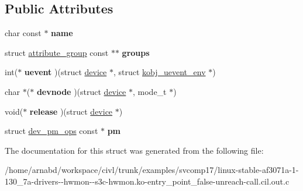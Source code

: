 \subsection*{Public Attributes}
\begin{DoxyCompactItemize}
\item 
\hypertarget{structdevice__type_a801bb4451edcbcd4a28e50d8c2c52688}{}char const $\ast$ {\bfseries name}\label{structdevice__type_a801bb4451edcbcd4a28e50d8c2c52688}

\item 
\hypertarget{structdevice__type_a1027f45aad44b138fd7ed95168e75346}{}struct \hyperlink{structattribute__group}{attribute\+\_\+group} const $\ast$$\ast$ {\bfseries groups}\label{structdevice__type_a1027f45aad44b138fd7ed95168e75346}

\item 
\hypertarget{structdevice__type_a20652da5cfe96ad8a72970169b4370e5}{}int($\ast$ {\bfseries uevent} )(struct \hyperlink{structdevice}{device} $\ast$, struct \hyperlink{structkobj__uevent__env}{kobj\+\_\+uevent\+\_\+env} $\ast$)\label{structdevice__type_a20652da5cfe96ad8a72970169b4370e5}

\item 
\hypertarget{structdevice__type_a1238b2414bf8a20df88968f02bfc342c}{}char $\ast$($\ast$ {\bfseries devnode} )(struct \hyperlink{structdevice}{device} $\ast$, mode\+\_\+t $\ast$)\label{structdevice__type_a1238b2414bf8a20df88968f02bfc342c}

\item 
\hypertarget{structdevice__type_a84f394e3b6dc49230395fc454ca2274e}{}void($\ast$ {\bfseries release} )(struct \hyperlink{structdevice}{device} $\ast$)\label{structdevice__type_a84f394e3b6dc49230395fc454ca2274e}

\item 
\hypertarget{structdevice__type_ab617269bdecad8caa6701f73ece5da04}{}struct \hyperlink{structdev__pm__ops}{dev\+\_\+pm\+\_\+ops} const $\ast$ {\bfseries pm}\label{structdevice__type_ab617269bdecad8caa6701f73ece5da04}

\end{DoxyCompactItemize}


The documentation for this struct was generated from the following file\+:\begin{DoxyCompactItemize}
\item 
/home/arnabd/workspace/civl/trunk/examples/svcomp17/linux-\/stable-\/af3071a-\/1-\/130\+\_\+7a-\/drivers-\/-\/hwmon-\/-\/s3c-\/hwmon.\+ko-\/entry\+\_\+point\+\_\+false-\/unreach-\/call.\+cil.\+out.\+c\end{DoxyCompactItemize}
